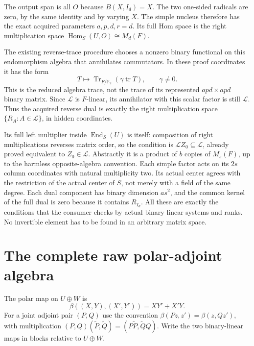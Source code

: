 \documentclass[11pt]{article}
\newcommand{\F}{\mathbb F}\newcommand{\End}{\operatorname{End}}
\newcommand{\Hom}{\operatorname{Hom}}\newcommand{\rank}{\operatorname{rank}}
\begin{document}
The output span is all $O$ because $B(X,I_d)=X$. The two one-sided
radicals are zero, by the same identity and by varying $X$. The simple
nucleus therefore has the exact acquired parameters $a,p,d,r=d$.
Its full Hom space is the right multiplication space
$\Hom_S(U,O)\cong M_d(F)$.

The existing reverse-trace procedure chooses a nonzero binary functional
on this endomorphism algebra that annihilates commutators. In these
proof coordinates it has the form
\[
 T\longmapsto\operatorname{Tr}_{F/\F_2}
                         (\gamma\operatorname{tr}T),\qquad\gamma\ne0.
\]
This is the reduced algebra trace, not the trace of its represented
$apd\times apd$ binary matrix. Since $\mathcal L$ is $F$-linear,
its annihilator with this scalar factor is still $\mathcal L$.
Thus the acquired reverse dual is exactly the right multiplication
space $\{R_A:A\in\mathcal L\}$, in hidden coordinates.

Its full left multiplier inside $\End_S(U)$ is itself: composition of
right multiplications reverses matrix order, so the condition is
$\mathcal L Z_0\subseteq\mathcal L$, already proved equivalent to
$Z_0\in\mathcal L$. Abstractly it is a product of $b$ copies of
$M_s(F)$, up to the harmless opposite-algebra convention. Each simple
factor acts on its $2s$ column coordinates with natural multiplicity two.
Its actual center agrees with the restriction of the actual center of
$S$, not merely with a field of the same degree. Each dual component
has binary dimension $as^2$, and the common kernel of the full dual is
zero because it contains $R_{I_d}$. All these are exactly the conditions
that the consumer checks by actual binary linear systems and ranks.
No invertible element has to be found in an arbitrary matrix space.

\section{The complete raw polar-adjoint algebra}

The polar map on $U\oplus W$ is
\[
 \beta((X,Y),(X',Y'))=XY'+X'Y.
\]
For a joint adjoint pair $(P,Q)$ use the convention
$\beta(Pz,z')=\beta(z,Qz')$, with multiplication
$(P,Q)(\widetilde P,\widetilde Q)
=(P\widetilde P,\widetilde Q Q)$. Write the two binary-linear maps in
blocks relative to $U\oplus W$.
\end{document}
